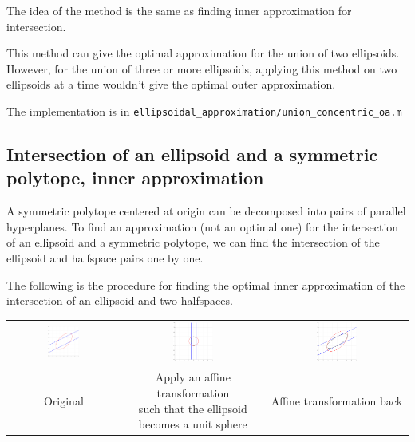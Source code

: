 \documentclass{article}
\begin{document}
The idea of the method is the same as finding inner approximation for intersection.

This method can give the optimal approximation for the union of two ellipsoids. However, for the union of three or more ellipsoids, applying this method on two ellipsoids at a time wouldn't give the optimal outer approximation.

The implementation is in \texttt{ellipsoidal\_approximation/union\_concentric\_oa.m}

\subsection{Intersection of an ellipsoid and a symmetric polytope, inner approximation}

A symmetric polytope centered at origin can be decomposed into pairs of parallel hyperplanes. To find an approximation (not an optimal one) for the intersection of an ellipsoid and a symmetric polytope, we can find the intersection of the ellipsoid and halfspace pairs one by one.

The following is the procedure for finding the optimal inner approximation of the intersection of an ellipsoid and two halfspaces.

\begin{table}[H]
	\centering
	\begin{tabular}{ccc}
		\includegraphics[width=0.3\textwidth]{polytope_intersect/1.pdf} & \includegraphics[width=0.3\textwidth]{polytope_intersect/2.pdf} & \includegraphics[width=0.3\textwidth]{polytope_intersect/3.pdf}\\
		Original & \makecell{Apply an affine transformation \\such that the ellipsoid \\becomes a unit sphere} & Affine transformation back
	\end{tabular}
	\label{polytope_intersec1}
\end{table}
\end{document}
